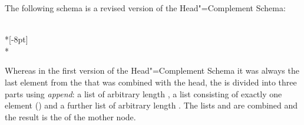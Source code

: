 The following schema is a revised version of the Head"=Complement Schema:
\begin{schema}
\label{schema-bin-prel2}
~\\*[-8pt]
 \impl\\*
\end{schema}
Whereas in the first version of the Head"=Complement Schema it was always the last element from the \compsl that was combined with the head,
the \compsl is divided into three parts using \emph{append}: a list of arbitrary length ,
a list consisting of exactly one element () and a further list of arbitrary length . The lists  and 
are combined and the result is the \compsv of the mother node.


